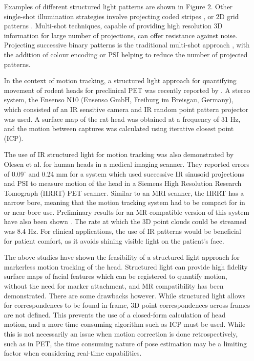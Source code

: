 \documentclass[class=article, crop=false]{standalone}
\begin{document}
\par
Examples of different structured light patterns are shown in Figure 2. Other single-shot illumination strategies involve projecting coded stripes \parencite{Boyer1987,Forster2007,Zhang2002}, or 2D grid patterns \parencite{Petriu2000,Pages2006,Albitar2006}. Multi-shot techniques, capable of providing high resolution 3D information for large number of projections, can offer resistance against noise. Projecting successive binary patterns is the traditional multi-shot approach \parencite{Posdamer1982}, with the addition of colour encoding \parencite{Caspi1998} or PSI \parencite{Huang2006} helping to reduce the number of projected patterns.
\par
In the context of motion tracking, a structured light approach for quantifying movement of rodent heads for preclinical PET was recently reported by \cite{Miranda2017}. A stereo system, the Ensenso N10 (Ensenso GmbH, Freiburg im Breisgau, Germany), which consisted of an IR sensitive camera and IR random point pattern projector was used. A surface map of the rat head was obtained at a frequency of 31 Hz, and the motion between captures was calculated using iterative closest point (ICP).
\par 
The use of IR structured light for motion tracking was also demonstrated by Olesen et al. \parencite*{Olesen2012} for human heads in a medical imaging scanner. They reported errors of 0.09$^{\circ}$ and 0.24 mm for a system which used successive IR sinusoid projections and PSI to measure motion of the head in a Siemens High Resolution Research Tomograph (HRRT) PET scanner. Similar to an MRI scanner, the HRRT has a narrow bore, meaning that the motion tracking system had to be compact for in or near-bore use. Preliminary results for an MR-compatible version of this system have also been shown \parencite{Olesen2015a}. The rate at which the 3D point clouds could be streamed was 8.4 Hz. For clinical applications, the use of IR patterns would be beneficial for patient comfort, as it avoids shining visible light on the patient's face.
\par
The above studies have shown the feasibility of a structured light approach for markerless motion tracking of the head. Structured light can provide high fidelity surface maps of facial features which can be registered to quantify motion, without the need for marker attachment, and MR compatibility has been demonstrated. There are some drawbacks however. While structured light allows for correspondences to be found in-frame, 3D point correspondences across frames are not defined. This prevents the use of a closed-form calculation of head motion, and a more time consuming algorithm such as ICP must be used. While this is not necessarily an issue when motion correction is done retrospectively, such as in PET, the time consuming nature of pose estimation may be a limiting factor when considering real-time capabilities.
\end{document}
